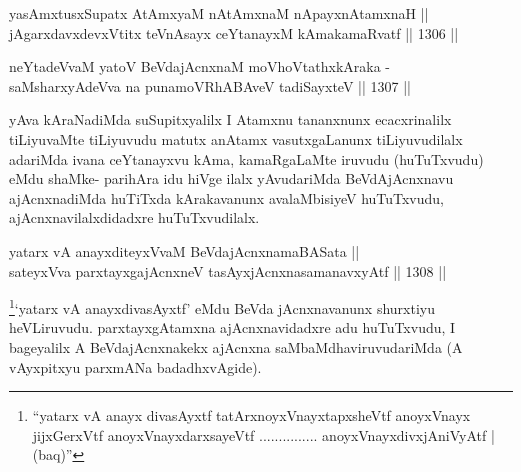 \begin{shl}
yasAmxtusxSupatx AtAmx\s yaM nA\s \s tAmxnaM nApayxnAtamxnaH || \\
jAgarxdavxdevxVtitx teVnAsayx ceYtanayxM kAmakamaRvatf \hfill || 1306 ||  
\end{shl}

\begin{shl}
neYtadeVvaM \footnotemark[2]yatoV BeVdajAcnxnaM moVhoVtathxkAraka -\\
saMsharxyAdeVva na punamoVRhABAveV tadiSayxteV \hfill || 1307 ||  
\end{shl}

\begin{artha}
yAva kAraNadiMda suSupitxyalilx I Atamxnu tananxnunx ecacxrinalilx tiLiyuvaMte tiLiyuvudu matutx anAtamx vasutxgaLanunx tiLiyuvudilalx adariMda ivana ceYtanayxvu kAma, kamaRgaLaMte iruvudu (huTuTxvudu) eMdu shaMke-
parihAra idu hiVge ilalx yAvudariMda BeVdAjAcnxnavu ajAcnxnadiMda huTiTxda kArakavanunx avalaMbisiyeV huTuTxvudu, ajAcnxnavilalxdidadxre huTuTxvudilalx.
\end{artha}


\begin{shl}
yatarx vA anayxditeyxVvaM BeVdajAcnxnamaBASata || \\
sateyxVva parxtayxgajAcnxneV tasAyxjAcnxnasamanavxyAtf \hfill || 1308 ||  
\end{shl}

\begin{artha}
\footnote{``yatarx vA anayx divasAyxtf tatArxnoyxV\s nayxtapxsheVtf anoyxV\s nayx jijxGerxVtf anoyxV\s nayxdarxsayeVtf ............... anoyxV\s nayxdivxjAniVyAtf | (baq)''}`yatarx vA anayxdivasAyxtf' eMdu BeVda jAcnxnavanunx shurxtiyu heVLiruvudu. parxtayxgAtamxna ajAcnxnavidadxre adu huTuTxvudu, I bageyalilx A BeVdajAcnxnakekx ajAcnxna saMbaMdhaviruvudariMda (A vAyxpitxyu parxmANa badadhxvAgide).
\end{artha}

